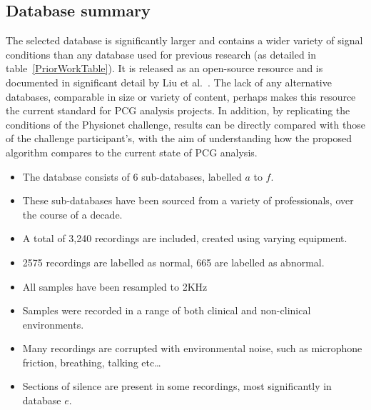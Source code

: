 \documentclass[titlepage, 12pt]{scrartcl} \usepackage{enumitem}
\begin{document}
\subsection{Database summary}
The selected database is significantly larger and contains a wider variety of
signal conditions than any database used for previous research (as detailed in
table~\ref{PriorWorkTable}). It is released as an open-source resource and is
documented in significant detail by Liu et al.~\parencite{Liu2016}. The lack of
any alternative databases, comparable in size or variety of content, perhaps
makes this resource the current standard for PCG analysis projects. In
addition, by replicating the conditions of the Physionet challenge, results can
be directly compared with those of the challenge participant's, with the aim of
understanding how the proposed algorithm compares to the current state of PCG
analysis.

\begin{itemize}
    \item The database consists of 6 sub-databases, labelled $a$ to $f$.
    \item These sub-databases have been sourced from a variety of professionals,
        over the course of a decade.
    \item A total of 3,240 recordings are included, created using varying equipment.
    \item 2575 recordings are labelled as normal, 665 are labelled as abnormal.
    \item All samples have been resampled to 2KHz
    \item Samples were recorded in a range of both clinical and
        non-clinical environments.
    \item Many recordings are corrupted with environmental noise, such as
        microphone friction, breathing, talking etc\ldots
    \item Sections of silence are present in some recordings, most
        significantly in database $e$.
\end{itemize}
\end{document}
